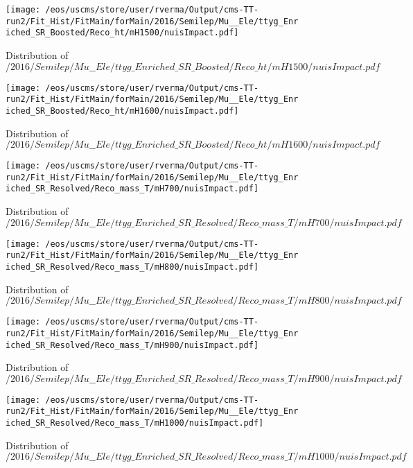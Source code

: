 \begin{figure}
\centering
\texttt{[image: /eos/uscms/store/user/rverma/Output/cms-TT-run2/Fit\_Hist/FitMain/forMain/2016/Semilep/Mu\_\_Ele/ttyg\_Enriched\_SR\_Boosted/Reco\_ht/mH1500/nuisImpact.pdf]}
\caption{Distribution of $/2016/Semilep/Mu\_\_Ele/ttyg\_Enriched\_SR\_Boosted/Reco\_ht/mH1500/nuisImpact.pdf$}
\end{figure}

\begin{figure}
\centering
\texttt{[image: /eos/uscms/store/user/rverma/Output/cms-TT-run2/Fit\_Hist/FitMain/forMain/2016/Semilep/Mu\_\_Ele/ttyg\_Enriched\_SR\_Boosted/Reco\_ht/mH1600/nuisImpact.pdf]}
\caption{Distribution of $/2016/Semilep/Mu\_\_Ele/ttyg\_Enriched\_SR\_Boosted/Reco\_ht/mH1600/nuisImpact.pdf$}
\end{figure}

\begin{figure}
\centering
\texttt{[image: /eos/uscms/store/user/rverma/Output/cms-TT-run2/Fit\_Hist/FitMain/forMain/2016/Semilep/Mu\_\_Ele/ttyg\_Enriched\_SR\_Resolved/Reco\_mass\_T/mH700/nuisImpact.pdf]}
\caption{Distribution of $/2016/Semilep/Mu\_\_Ele/ttyg\_Enriched\_SR\_Resolved/Reco\_mass\_T/mH700/nuisImpact.pdf$}
\end{figure}

\begin{figure}
\centering
\texttt{[image: /eos/uscms/store/user/rverma/Output/cms-TT-run2/Fit\_Hist/FitMain/forMain/2016/Semilep/Mu\_\_Ele/ttyg\_Enriched\_SR\_Resolved/Reco\_mass\_T/mH800/nuisImpact.pdf]}
\caption{Distribution of $/2016/Semilep/Mu\_\_Ele/ttyg\_Enriched\_SR\_Resolved/Reco\_mass\_T/mH800/nuisImpact.pdf$}
\end{figure}

\begin{figure}
\centering
\texttt{[image: /eos/uscms/store/user/rverma/Output/cms-TT-run2/Fit\_Hist/FitMain/forMain/2016/Semilep/Mu\_\_Ele/ttyg\_Enriched\_SR\_Resolved/Reco\_mass\_T/mH900/nuisImpact.pdf]}
\caption{Distribution of $/2016/Semilep/Mu\_\_Ele/ttyg\_Enriched\_SR\_Resolved/Reco\_mass\_T/mH900/nuisImpact.pdf$}
\end{figure}

\begin{figure}
\centering
\texttt{[image: /eos/uscms/store/user/rverma/Output/cms-TT-run2/Fit\_Hist/FitMain/forMain/2016/Semilep/Mu\_\_Ele/ttyg\_Enriched\_SR\_Resolved/Reco\_mass\_T/mH1000/nuisImpact.pdf]}
\caption{Distribution of $/2016/Semilep/Mu\_\_Ele/ttyg\_Enriched\_SR\_Resolved/Reco\_mass\_T/mH1000/nuisImpact.pdf$}
\end{figure}

